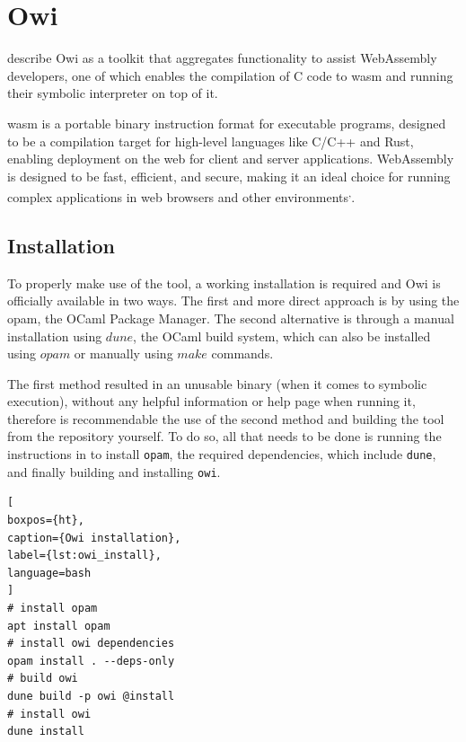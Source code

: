 
\section{Owi}\label{section:owi}

\citet{Andrès2024} describe Owi as a toolkit that aggregates functionality to assist WebAssembly developers, one of which enables the compilation of C code to \acrshort{wasm} and running their symbolic interpreter on top of it.

\acrlong{wasm} is a portable binary instruction format for executable programs, designed to be a compilation target for high-level languages like C/C++ and Rust, enabling deployment on the web for client and server applications. WebAssembly is designed to be fast, efficient, and secure, making it an ideal choice for running complex applications in web browsers and other environments\textsuperscript{,}.

\subsection{Installation}

To properly make use of the tool, a working installation is required and Owi is officially available in two ways. The first and more direct approach is by using the opam, the OCaml Package Manager. The second alternative is through a manual installation using $dune$, the OCaml build system, which can also be installed using $opam$ or manually using $make$ commands.

The first method resulted in an unusable binary (when it comes to symbolic execution), without any helpful information or help page when running it, therefore is recommendable the use of the second method and building the tool from the repository yourself. To do so, all that needs to be done is running the instructions in  to install \lstinline+opam+, the required dependencies, which include \lstinline+dune+, and finally building and installing \lstinline+owi+.

\begin{lstlisting}[
boxpos={ht},
caption={Owi installation},
label={lst:owi_install},
language=bash
]
# install opam 
apt install opam
# install owi dependencies
opam install . --deps-only
# build owi
dune build -p owi @install
# install owi
dune install
\end{lstlisting}

